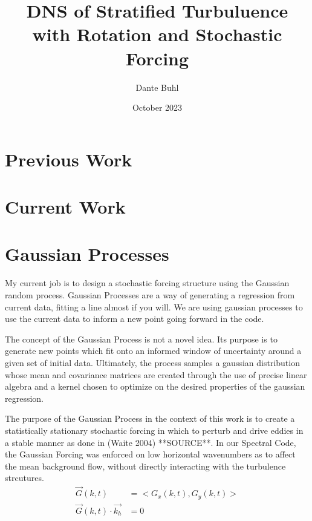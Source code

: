 \documentclass{article}
\title{DNS of Stratified Turbuluence with Rotation and Stochastic Forcing}
\author{Dante Buhl}
\date{October 2023}
\begin{document}
\maketitle

\section{Previous Work}


\section{Current Work}


\section{Gaussian Processes}
\begin{comment}
    
\end{comment}

My current job is to design a stochastic forcing structure using the Gaussian random process. Gaussian Processes are a way of generating a regression from current data, fitting a line almost if you will. We are using gaussian processes to use the current data to inform a new point going forward in the code. 

The concept of the Gaussian Process is not a novel idea. Its purpose is to generate new points which fit onto an informed window of uncertainty around a given set of initial data. Ultimately, the process samples a gaussian distribution whose mean and covariance matrices are created through the use of precise linear algebra and a kernel chosen to optimize on the desired properties of the gaussian regression. 

The purpose of the Gaussian Process in the context of this work is to create a statistically stationary stochastic forcing in which to perturb and drive eddies in a stable manner as done in (Waite 2004) **SOURCE**. In our Spectral Code, the Gaussian Forcing was enforced on low horizontal wavenumbers as to affect the mean background flow, without directly interacting with the turbulence strcutures. 
\begin{align*}
    \vec{G}(k, t) &= <G_x(k, t), G_y(k, t)> \\
    \vec{G}(k, t) \cdot \vec{k_h} &= 0
\end{align*}
\end{document}
